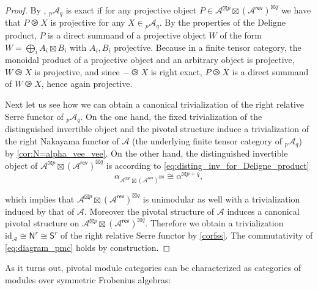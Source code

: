 \documentclass[11pt]{article}
\theoremstyle{definition}
\begin{document}
\begin{proof}
By \cite[Lemma 3.2]{relserre}, ${}_p \mathcal{A}_q$ is exact if for any projective object $P\in \mathcal{A}^{\boxtimes p}\boxtimes \left( \mathcal{A}^{\mathsf{rev}} \right)^{\boxtimes q}$ we have that  $P \ogreaterthan X$ is projective for any $X \in {}_p \mathcal{A}_q$. By the properties of the Deligne product, $P$ is a direct summand of a projective object $W$ of the form $W= \bigoplus_i A_i \boxtimes B_i$ with $A_i, B_i$ projective. Because in a finite tensor category, the monoidal product of a projective object and an arbitrary object is projective, $W \ogreaterthan X$ is projective, and since $- \ogreaterthan X$ is right exact, $P \ogreaterthan X$ is a direct summand of $W \ogreaterthan X$, hence again projective.




Next let us see how we can obtain a canonical trivialization of the right relative Serre functor of ${}_p \mathcal{A}_q$. On the one hand, the fixed trivialization of the distinguished invertible object and the pivotal structure induce a trivialization of the right Nakayama functor of $\mathcal{A}$ (the underlying finite tensor category of ${}_p \mathcal{A}_q$) by \cref{cor:N=alpha_vee_vee}. On the other hand, the distinguished invertible object of $\mathcal{A}^{\boxtimes p}\boxtimes \left( \mathcal{A}^{\mathsf{rev}} \right)^{\boxtimes q}$ is according to  \eqref{eq:disting_inv_for_Deligne_product} $$ \alpha_{\mathcal{A}^{\boxtimes p}\boxtimes \left( \mathcal{A}^{\mathsf{rev}} \right)^{\boxtimes q}} \cong \alpha^{\boxtimes p+q} ,$$ 

which implies that $\mathcal{A}^{\boxtimes p}\boxtimes \left( \mathcal{A}^{\mathsf{rev}} \right)^{\boxtimes q}$ is unimodular as well with a trivialization induced by that of $\mathcal{A}$. Moreover the pivotal structure of $\mathcal{A}$ induces a canonical pivotal structure on $\mathcal{A}^{\boxtimes p}\boxtimes \left( \mathcal{A}^{\mathsf{rev}} \right)^{\boxtimes q}$. Therefore we obtain a trivialization $\mathrm{id}_\mathcal{A} \cong \mathsf{N}^r \cong \mathsf{S}^r$ of the right relative Serre functor by   \cref{corfss}. The commutativity of \eqref{eq:diagram_pmc} holds by construction.
\end{proof}








As it turns out, pivotal module categories can be characterized as categories of modules over symmetric Frobenius algebras:
\end{document}
